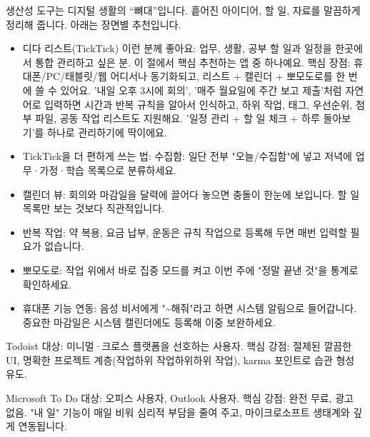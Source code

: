 


생산성 도구는 디지털 생활의 “뼈대”입니다. 흩어진 아이디어, 할 일, 자료를 말끔하게 정리해 줍니다. 아래는 장면별 추천입니다.


\begin{itemize}
  \item 디다 리스트(TickTick) 이런 분께 좋아요: 업무, 생활, 공부 할 일과 일정을 한곳에서 통합 관리하고 싶은 분. 이 절에서 핵심 추천하는 앱 중 하나예요. 핵심 장점: 휴대폰/PC/태블릿/웹 어디서나 동기화되고, 리스트 + 캘린더 + 뽀모도로를 한 번에 쓸 수 있어요. '내일 오후 3시에 회의', '매주 월요일에 주간 보고 제출'처럼 자연어로 입력하면 시간과 반복 규칙을 알아서 인식하고, 하위 작업, 태그, 우선순위, 첨부 파일, 공동 작업 리스트도 지원해요. '일정 관리 + 할 일 체크 + 하루 돌아보기'를 하나로 관리하기에 딱이에요.
  \item TickTick을 더 편하게 쓰는 법: 수집함: 일단 전부 "오늘/수집함"에 넣고 저녁에 업무·가정·학습 목록으로 분류하세요.
  \item 캘린더 뷰: 회의와 마감일을 달력에 끌어다 놓으면 충돌이 한눈에 보입니다. 할 일 목록만 보는 것보다 직관적입니다.
  \item 반복 작업: 약 복용, 요금 납부, 운동은 규칙 작업으로 등록해 두면 매번 입력할 필요가 없습니다.
  \item 뽀모도로: 작업 위에서 바로 집중 모드를 켜고 이번 주에 "정말 끝낸 것"을 통계로 확인하세요.
  \item 휴대폰 기능 연동: 음성 비서에게 "\textasciitilde{}해줘"라고 하면 시스템 알림으로 들어갑니다. 중요한 마감일은 시스템 캘린더에도 등록해 이중 보완하세요.
\end{itemize}

Todoist 대상: 미니멀·크로스 플랫폼을 선호하는 사용자. 핵심 강점: 절제된 깔끔한 UI, 명확한 프로젝트 계층(작업하위 작업하위하위 작업), karma 포인트로 습관 형성 유도.

Microsoft To Do 대상: 오피스 사용자, Outlook 사용자. 핵심 강점: 완전 무료, 광고 없음. "내 일" 기능이 매일 비워 심리적 부담을 줄여 주고, 마이크로소프트 생태계와 깊게 연동됩니다.

